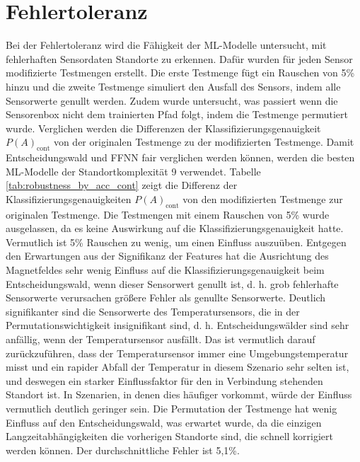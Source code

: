\section{Fehlertoleranz}
Bei der Fehlertoleranz wird die Fähigkeit der ML-Modelle untersucht, mit fehlerhaften Sensordaten Standorte zu erkennen.
Dafür wurden für jeden Sensor modifizierte Testmengen erstellt.
Die erste Testmenge fügt ein Rauschen von 5\% hinzu und die zweite Testmenge simuliert den Ausfall des Sensors, indem alle Sensorwerte genullt werden.
Zudem wurde untersucht, was passiert wenn die Sensorenbox nicht dem trainierten Pfad folgt, indem die Testmenge permutiert wurde.
Verglichen werden die Differenzen der Klassifizierungsgenauigkeit $P(A)_{\text{cont}}$ von der originalen Testmenge zu der modifizierten Testmenge.
Damit Entscheidungswald und FFNN fair verglichen werden können, werden die besten ML-Modelle der Standortkomplexität 9 verwendet.
\newline
\newline
Tabelle \ref{tab:robustness_by_acc_cont} zeigt die Differenz der Klassifizierungsgenauigkeiten $P(A)_{\text{cont}}$ von den modifizierten Testmenge zur originalen Testmenge.
Die Testmengen mit einem Rauschen von 5\% wurde ausgelassen, da es keine Auswirkung auf die Klassifizierungsgenauigkeit hatte.
Vermutlich ist 5\% Rauschen zu wenig, um einen Einfluss auszuüben.
\newpage
Entgegen den Erwartungen aus der Signifikanz der Features hat die Ausrichtung des Magnetfeldes sehr wenig Einfluss auf die Klassifizierungsgenauigkeit beim Entscheidungswald,
wenn dieser Sensorwert genullt ist, d. h. grob fehlerhafte Sensorwerte verursachen größere Fehler als genullte Sensorwerte.
Deutlich signifikanter sind die Sensorwerte des Temperatursensors, die in der Permutationswichtigkeit insignifikant sind,
d. h. Entscheidungswälder sind sehr anfällig, wenn der Temperatursensor ausfällt.
Das ist vermutlich darauf zurückzuführen, dass der Temperatursensor immer eine Umgebungstemperatur misst und
ein rapider Abfall der Temperatur in diesem Szenario sehr selten ist, und deswegen ein
starker Einflussfaktor für den in Verbindung stehenden Standort ist.
In Szenarien, in denen dies häufiger vorkommt, würde der Einfluss vermutlich deutlich geringer sein.
Die Permutation der Testmenge hat wenig Einfluss auf den Entscheidungswald, was erwartet wurde,
da die einzigen Langzeitabhängigkeiten die vorherigen Standorte sind, die schnell korrigiert werden können.
Der durchschnittliche Fehler ist 5,1\%.
